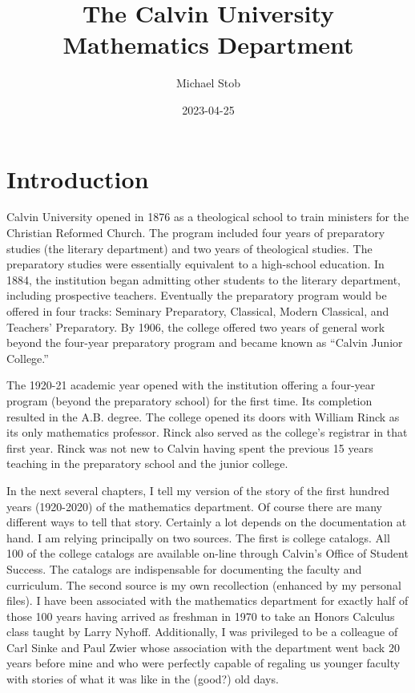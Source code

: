 \documentclass[
]{book}
\title{The Calvin University Mathematics Department}
\author{Michael Stob}
\date{2023-04-25}
\begin{document}
\maketitle

{
\setcounter{tocdepth}{1}
\tableofcontents
}
\hypertarget{introduction}{%
\chapter{Introduction}\label{introduction}}

Calvin University opened in 1876 as a theological school to train ministers for the Christian Reformed Church. The program included four years of preparatory studies (the literary department) and two years of theological studies. The preparatory studies were essentially equivalent to a high-school education. In 1884, the institution began admitting other students to the literary department, including prospective teachers. Eventually the preparatory program would be offered in four tracks: Seminary Preparatory, Classical, Modern Classical, and Teachers' Preparatory. By 1906, the college offered two years of general work beyond the four-year preparatory program and became known as ``Calvin Junior College.''

The 1920-21 academic year opened with the institution offering a four-year program (beyond the preparatory school) for the first time. Its completion resulted in the A.B. degree. The college opened its doors with William Rinck as its only mathematics professor. Rinck also served as the college's registrar in that first year. Rinck was not new to Calvin having spent the previous 15 years teaching in the preparatory school and the junior college.

In the next several chapters, I tell my version of the story of the first hundred years (1920-2020) of the mathematics department. Of course there are many different ways to tell that story. Certainly a lot depends on the documentation at hand. I am relying principally on two sources. The first is college catalogs. All 100 of the college catalogs are available on-line through Calvin's Office of Student Success. The catalogs are indispensable for documenting the faculty and curriculum. The second source is my own recollection (enhanced by my personal files). I have been associated with the mathematics department for exactly half of those 100 years having arrived as freshman in 1970 to take an Honors Calculus class taught by Larry Nyhoff. Additionally, I was privileged to be a colleague of Carl Sinke and Paul Zwier whose association with the department went back 20 years before mine and who were perfectly capable of regaling us younger faculty with stories of what it was like in the (good?) old days.
\end{document}

